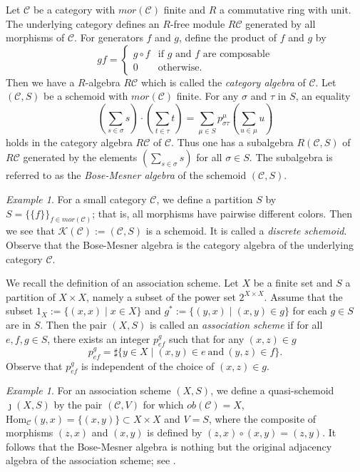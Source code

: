 \documentclass{amsart}
\theoremstyle{definition}
\theoremstyle{remark}
\newtheorem{ex}[thm]{Example}
\newcommand{\K}{R}%
\newcommand{\C}{{\mathcal C}}
\newcommand{\calK}{{\mathcal K}}
\begin{document}
Let $\C$ be a category with $mor (\C)$ finite and $R$ a commutative ring with unit.   
The underlying category defines an $\K$-free module $\K\C$ generated by all morphisms of $\C$. 
For generators $f$ and $g$, define the product of $f$ and $g$ by 
$$
gf = \begin{cases}
g \circ f  & \text{if $g$ and $f$ are composable}  \\
0 & \text{otherwise}. 
\end{cases}
$$
Then we have a $\K$-algebra $\K\C$ which is called the {\it category algebra} of $\C$.
Let $(\C, S)$ be a schemoid with $mor (\C)$ finite. 
For any $\sigma$ and $\tau$ in $S$, an equality 
$$
(\sum_{s\in \sigma} s) \cdot (\sum_{t\in \tau} t) = \sum_{\mu\in S} p_{\sigma\tau}^\mu (\sum_{u\in \mu} u)
$$ 
holds in the category algebra $\K \C$ of $\C$. Thus one has  
a subalgebra 
$
\K(\C, S)
$
of $\K\C$ generated by the elements $(\sum_{s\in \sigma} s)$ for all $\sigma \in S$. 
The subalgebra is referred to 
as the {\it Bose-Mesner algebra} of the schemoid $(\C, S)$. 

\begin{ex}\label{ex:1}
For a small category $\C$, we define a partition $S$ by $S=\{\{f\}\}_{f \in mor(\C)}$; that is, all morphisms have 
pairwise different colors. 
Then we see that $\calK(\C):=(\C, S)$ is a schemoid. 
It is called a {\it discrete schemoid}.  
Observe that the Bose-Mesner algebra is the category algebra of the underlying category $\C$. 
\end{ex}

We recall the definition of an association scheme. 
Let $X$ be a finite set and $S$ a partition of $X\times X$, namely a subset of the power set $2^{X\times X}$. 
Assume that the subset $1_X:=\{ (x, x) \mid x \in X\}$ and $g^*:=\{(y, x) \mid (x, y) \in g\}$ for each 
$g \in S$ are in $S$.  Then the pair $(X, S)$ is called an 
{\it association scheme} if for all 
$e, f, g \in S$, there exists an integer $p_{ef}^g$ such that for any $(x, z) \in g$ 
$$
p_{ef}^g=\sharp \{y \in X \mid (x, y)\in e \ \text{and} \ (y, z) \in f \}. 
$$
Observe that $p_{ef}^g$ is independent of the choice of $(x, z) \in g$. 

\begin{ex}\label{ex:2}
For an association scheme $(X, S)$, we define a quasi-schemoid $\jmath(X, S)$ by the pair $(\C, V)$ for which 
$ob(\C)=X$, $\text{Hom}_\C(y, x) =\{(x, y)\} \subset X\times X$ and $V =S$, where the composite of morphisms 
$(z, x)$ and $(x, y)$ is defined by $(z, x) \circ (x, y) = (z, y)$.  It follows that the Bose-Mesner algebra is nothing but the original 
adjacency algebra of the association scheme; see \cite[Example 2.6 (i)]{K-M}.
\end{ex}
\end{document}
